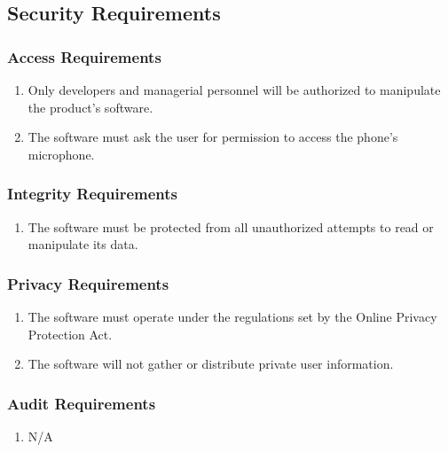 \documentclass[]{article}
\begin{document}

\subsection{Security Requirements}
\label{sub:security_requirements}

\subsubsection{Access Requirements}
\label{ssub:access_requirements}
\begin{enumerate}[{SR}1. ]
	\item Only developers and managerial personnel will be authorized to manipulate the product’s software.
	\item  The software must ask the user for permission to access the phone’s microphone.

\end{enumerate}

\subsubsection{Integrity Requirements}
\label{ssub:integrity_requirements}
\begin{enumerate}[{SR}1. ]
	\item The software must be protected from all unauthorized attempts to read or manipulate its data.
\end{enumerate}

\subsubsection{Privacy Requirements}
\label{ssub:privacy_requirements}
\begin{enumerate}[{SR}1. ]
	\item The software must operate under the regulations set by the Online Privacy Protection Act.
	\item The software will not gather or distribute private user information.

\end{enumerate}

\subsubsection{Audit Requirements}
\label{ssub:audit_requirements}
\begin{enumerate}[{SR}1. ]
	\item N/A
\end{enumerate}
\end{document}
